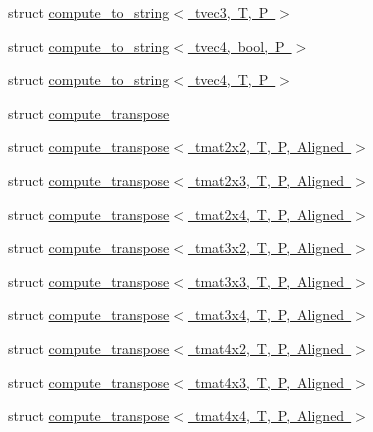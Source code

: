 \begin{DoxyCompactItemize}
struct \mbox{\hyperlink{structglm_1_1detail_1_1compute__to__string_3_01tvec3_00_01_t_00_01_p_01_4}{compute\+\_\+to\+\_\+string$<$ tvec3, T, P $>$}}
\item 
struct \mbox{\hyperlink{structglm_1_1detail_1_1compute__to__string_3_01tvec4_00_01bool_00_01_p_01_4}{compute\+\_\+to\+\_\+string$<$ tvec4, bool, P $>$}}
\item 
struct \mbox{\hyperlink{structglm_1_1detail_1_1compute__to__string_3_01tvec4_00_01_t_00_01_p_01_4}{compute\+\_\+to\+\_\+string$<$ tvec4, T, P $>$}}
\item 
struct \mbox{\hyperlink{structglm_1_1detail_1_1compute__transpose}{compute\+\_\+transpose}}
\item 
struct \mbox{\hyperlink{structglm_1_1detail_1_1compute__transpose_3_01tmat2x2_00_01_t_00_01_p_00_01_aligned_01_4}{compute\+\_\+transpose$<$ tmat2x2, T, P, Aligned $>$}}
\item 
struct \mbox{\hyperlink{structglm_1_1detail_1_1compute__transpose_3_01tmat2x3_00_01_t_00_01_p_00_01_aligned_01_4}{compute\+\_\+transpose$<$ tmat2x3, T, P, Aligned $>$}}
\item 
struct \mbox{\hyperlink{structglm_1_1detail_1_1compute__transpose_3_01tmat2x4_00_01_t_00_01_p_00_01_aligned_01_4}{compute\+\_\+transpose$<$ tmat2x4, T, P, Aligned $>$}}
\item 
struct \mbox{\hyperlink{structglm_1_1detail_1_1compute__transpose_3_01tmat3x2_00_01_t_00_01_p_00_01_aligned_01_4}{compute\+\_\+transpose$<$ tmat3x2, T, P, Aligned $>$}}
\item 
struct \mbox{\hyperlink{structglm_1_1detail_1_1compute__transpose_3_01tmat3x3_00_01_t_00_01_p_00_01_aligned_01_4}{compute\+\_\+transpose$<$ tmat3x3, T, P, Aligned $>$}}
\item 
struct \mbox{\hyperlink{structglm_1_1detail_1_1compute__transpose_3_01tmat3x4_00_01_t_00_01_p_00_01_aligned_01_4}{compute\+\_\+transpose$<$ tmat3x4, T, P, Aligned $>$}}
\item 
struct \mbox{\hyperlink{structglm_1_1detail_1_1compute__transpose_3_01tmat4x2_00_01_t_00_01_p_00_01_aligned_01_4}{compute\+\_\+transpose$<$ tmat4x2, T, P, Aligned $>$}}
\item 
struct \mbox{\hyperlink{structglm_1_1detail_1_1compute__transpose_3_01tmat4x3_00_01_t_00_01_p_00_01_aligned_01_4}{compute\+\_\+transpose$<$ tmat4x3, T, P, Aligned $>$}}
\item 
struct \mbox{\hyperlink{structglm_1_1detail_1_1compute__transpose_3_01tmat4x4_00_01_t_00_01_p_00_01_aligned_01_4}{compute\+\_\+transpose$<$ tmat4x4, T, P, Aligned $>$}}

\end{DoxyCompactItemize}
